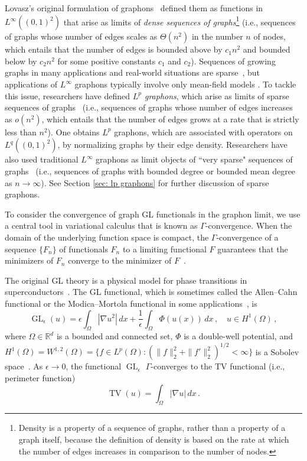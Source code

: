 \documentclass[11pt]{amsart}
\def\R{\mathbb{R}}
\def\ep{\epsilon}
\def\ra{\rightarrow}
\def\GL{\operatorname{GL}}
\def\TV{\operatorname{TV}}
\numberwithin{equation}{section}
\begin{document}
Lovasz's original formulation of graphons~\cite{lovasz2012large} defined them as functions in $L^\infty((0,1)^2)$ that arise as limits of \textit{dense sequences of graphs}\footnote{Density is a property of a sequence of graphs, rather than a property of a graph itself, because the definition of density is based on the rate at which the number of edges increases in comparison to the number of nodes.} (i.e., sequences of graphs whose number of edges scales as $\Theta(n^2)$ in the number $n$ of nodes, which entails that the number of edges is bounded above by $c_1 n^2$ and {bounded} below by $c_2 n^2$ for some {positive constants $c_1$ and $c_2$}). Sequences of growing graphs in many applications and real-world situations are sparse~\cite{newman2018}, but applications of $L^\infty$ graphons typically involve only mean-field models \cite{bayraktar2023graphon, caines2021graphon}. To tackle this issue, researchers have defined \emph{$L^p$ graphons}, which arise as limits of sparse sequences of graphs~\cite{bollobas2007metrics,borgs2018LpII} (i.e., sequences of graphs whose number of edges increases as $o(n^2)$, which entails that the number of edges grows at a rate that is strictly less than $n^2$). One obtains $L^p$ graphons, which are associated with operators on $L^q((0,1)^2)$, by normalizing graphs by their edge density. Researchers have {also used traditional} $L^\infty$ graphons as limit objects of ``very sparse" sequences of graphs~\cite{bollobas2007metrics, bollobas2011sparse} (i.e., sequences of graphs with bounded degree or bounded mean degree as $n \ra \infty$). See Section \ref{sec: lp graphons} for further discussion of sparse graphons.

To consider the convergence of graph GL functionals in the graphon limit, we use a central tool in variational calculus that is known as $\Gamma$-convergence. {When} the domain of the underlying function space is compact, the $\Gamma$-convergence of a sequence $\{F_n\}$ of functionals $F_n$ to a limiting functional $F$ guarantees that the minimizers of $F_n$ converge to the minimizer of $F$~\cite{braides2006handbook}. 

The original GL theory is a physical model for phase transitions in superconductors~\cite{du1992analysis,cyrot1973ginzburg}. The GL functional, which is sometimes called the Allen--Cahn functional or the Modica--Mortola functional in some applications~\cite{allen1979microscopic,du2020phase,modica1977esempio}, is
\begin{equation}  \label{eq: classical GL}
    \GL_\ep (u) = \ep \int_\Omega \left|\nabla u^2\right| \,dx + \frac{1}{\ep} \int_\Omega\Phi(u(x)) \,dx \,, \quad u \in H^1(\Omega) \,,
\end{equation}
where $\Omega \in \R^d$ is a {bounded and connected set}, $\Phi$ is a double-well potential, and $H^1(\Omega) = W^{1,2}(\Omega) = \{f \in L^p(\Omega): \left(\|f\|_2^2 + \|f'\|_2^2\right)^{1/2} < \infty\}$ is a Sobolev space~\cite{evans2022partial}. As $\ep \ra 0$, the functional $\GL_\ep$ $\Gamma$-converges to the TV functional (i.e., perimeter function) \cite{bronsard1991motion}
\begin{equation}     \label{eq: classical TV}
    \TV(u) = \int_\Omega \left|\nabla u\right| \,dx \, .
\end{equation}
\end{document}

